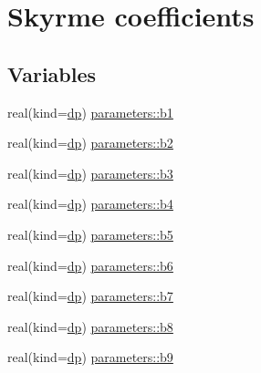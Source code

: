 \hypertarget{group__SKYRME__COEFFS}{}\section{Skyrme coefficients}
\label{group__SKYRME__COEFFS}
\subsection*{Variables}
\begin{DoxyCompactItemize}
\item 
real(kind=\mbox{\hyperlink{namespaceparameters_a52f8c6351fd79345d8811e065bcbbb37}{dp}}) \mbox{\hyperlink{group__SKYRME__COEFFS_ga370f8790e2b550acb651df944341c38a}{parameters\+::b1}}
\item 
real(kind=\mbox{\hyperlink{namespaceparameters_a52f8c6351fd79345d8811e065bcbbb37}{dp}}) \mbox{\hyperlink{group__SKYRME__COEFFS_gafeab3f7d25c9403fc9278f88e131e394}{parameters\+::b2}}
\item 
real(kind=\mbox{\hyperlink{namespaceparameters_a52f8c6351fd79345d8811e065bcbbb37}{dp}}) \mbox{\hyperlink{group__SKYRME__COEFFS_ga9b2ac7e2a2fd38fad3f2d4aa9eb74827}{parameters\+::b3}}
\item 
real(kind=\mbox{\hyperlink{namespaceparameters_a52f8c6351fd79345d8811e065bcbbb37}{dp}}) \mbox{\hyperlink{group__SKYRME__COEFFS_gaa0e98c8120ce5a6ee2c59e99e54b1564}{parameters\+::b4}}
\item 
real(kind=\mbox{\hyperlink{namespaceparameters_a52f8c6351fd79345d8811e065bcbbb37}{dp}}) \mbox{\hyperlink{group__SKYRME__COEFFS_ga86d34226c6b6f89e732f7acb9d6fc53d}{parameters\+::b5}}
\item 
real(kind=\mbox{\hyperlink{namespaceparameters_a52f8c6351fd79345d8811e065bcbbb37}{dp}}) \mbox{\hyperlink{group__SKYRME__COEFFS_ga375601587cabd94f376823158f6b3573}{parameters\+::b6}}
\item 
real(kind=\mbox{\hyperlink{namespaceparameters_a52f8c6351fd79345d8811e065bcbbb37}{dp}}) \mbox{\hyperlink{group__SKYRME__COEFFS_ga93c2fa7fcb7fac6304867a02d6fb21c3}{parameters\+::b7}}
\item 
real(kind=\mbox{\hyperlink{namespaceparameters_a52f8c6351fd79345d8811e065bcbbb37}{dp}}) \mbox{\hyperlink{group__SKYRME__COEFFS_ga9b6e33a75b631e3ba0f050460ffd5895}{parameters\+::b8}}
\item 
real(kind=\mbox{\hyperlink{namespaceparameters_a52f8c6351fd79345d8811e065bcbbb37}{dp}}) \mbox{\hyperlink{group__SKYRME__COEFFS_ga78905f183069e7fb9d101ae402ddd299}{parameters\+::b9}}

\end{DoxyCompactItemize}
